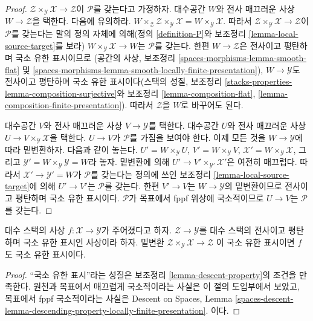 \begin{proof}
$\mathcal{Z} \times_\mathcal{Y} \mathcal{X} \to \mathcal{Z}$이
$\mathcal{P}$를 갖는다고 가정하자. 대수공간 $W$와 전사 매끄러운 사상
$W \to \mathcal{Z}$을 택한다. 다음에 유의하라.
$W \times_\mathcal{Z} \mathcal{Z} \times_\mathcal{Y} \mathcal{X} =
W \times_\mathcal{Y} \mathcal{X}$. 따라서
$\mathcal{Z} \times_\mathcal{Y} \mathcal{X} \to \mathcal{Z}$이
$\mathcal{P}$를 갖는다는 말의 정의 자체에 의해(정의
\ref{definition-P}와 보조정리 \ref{lemma-local-source-target}를 보라)
$W \times_\mathcal{Y} \mathcal{X} \to W$는 $\mathcal{P}$를 갖는다.
한편 $W \to \mathcal{Z}$은 전사이고 평탄하며 국소 유한 표시이므로
(공간의 사상, 보조정리 \ref{spaces-morphisms-lemma-smooth-flat} 및
\ref{spaces-morphisms-lemma-smooth-locally-finite-presentation}),
$W \to \mathcal{Y}$도 전사이고 평탄하며 국소 유한 표시이다(스택의
성질, 보조정리 \ref{stacks-properties-lemma-composition-surjective}와
보조정리 \ref{lemma-composition-flat},
\ref{lemma-composition-finite-presentation}). 따라서 $\mathcal{Z}$을
$W$로 바꾸어도 된다.

\medskip\noindent
대수공간 $V$와 전사 매끄러운 사상 $V \to \mathcal{Y}$를 택한다.
대수공간 $U$와 전사 매끄러운 사상
$U \to V \times_\mathcal{Y} \mathcal{X}$을 택한다. $U \to V$가
$\mathcal{P}$를 가짐을 보여야 한다. 이제 모든 것을
$W \to \mathcal{Y}$에 따라 밑변환하자. 다음과 같이 놓는다.
$U' = W \times_\mathcal{Y} U$,
$V' = W \times_\mathcal{Y} V$,
$\mathcal{X}' = W \times_\mathcal{Y} \mathcal{X}$,
그리고 $\mathcal{Y}' = W \times_\mathcal{Y} \mathcal{Y} = W$라 놓자.
밑변환에 의해 $U' \to V' \times_{\mathcal{Y}'} \mathcal{X}'$은 여전히
매끄럽다. 따라서 $\mathcal{X}' \to \mathcal{Y}' = W$가
$\mathcal{P}$를 갖는다는 정의에 쓰인 보조정리
\ref{lemma-local-source-target}에 의해 $U' \to V'$는 $\mathcal{P}$를
갖는다. 한편 $V' \to V$는 $W \to \mathcal{Y}$의 밑변환이므로 전사이고
평탄하며 국소 유한 표시이다. $\mathcal{P}$가 목표에서 fppf 위상에
국소적이므로 $U \to V$는 $\mathcal{P}$를 갖는다.
\end{proof}

\begin{lemma}
\label{lemma-descent-finite-presentation}
대수 스택의 사상 $f : \mathcal{X} \to \mathcal{Y}$가 주어졌다고 하자.
$\mathcal{Z} \to \mathcal{Y}$를 대수 스택의 전사이고 평탄하며 국소
유한 표시인 사상이라 하자. 밑변환
$\mathcal{Z} \times_\mathcal{Y} \mathcal{X} \to \mathcal{Z}$
이 국소 유한 표시이면 $f$도 국소 유한 표시이다.
\end{lemma}

\begin{proof}
``국소 유한 표시''라는 성질은 보조정리
\ref{lemma-descent-property}의 조건을 만족한다.
원천과 목표에서 매끄럽게 국소적이라는 사실은 이 절의 도입부에서
보았고, 목표에서 fppf 국소적이라는 사실은 Descent on Spaces, Lemma
\ref{spaces-descent-lemma-descending-property-locally-finite-presentation}.
이다.
\end{proof}

